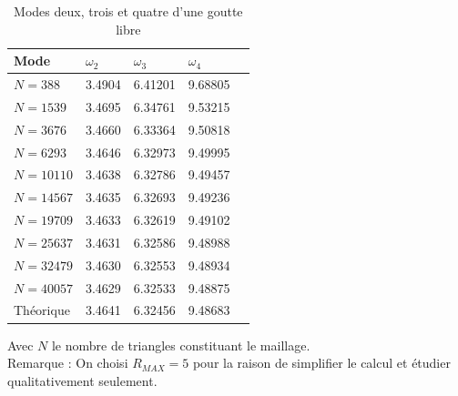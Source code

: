 \documentclass[a4paper]{report}
\begin{document}
\begin{table}[htp]
\begin{center}
    \begin{tabular}{ | l | l | l | l | l | }
    \hline
    Mode & $\omega_2$ & $\omega_3$ & $\omega_4$ \\
    \hline
    $N = 388  $ & 3.4904 & 6.41201 & 9.68805 \\ %
    \hline
    $N = 1539 $ & 3.4695 & 6.34761 & 9.53215 \\ %
    \hline
    $N = 3676 $ & 3.4660 & 6.33364 & 9.50818 \\ %
    \hline
    $N = 6293 $ & 3.4646 & 6.32973 & 9.49995 \\ %
    \hline
    $N = 10110$ & 3.4638 & 6.32786 & 9.49457 \\ %
    \hline
    $N = 14567$ & 3.4635 & 6.32693 & 9.49236 \\ %
    \hline
    $N = 19709$ & 3.4633 & 6.32619 & 9.49102 \\ %
    \hline
    $N = 25637$ & 3.4631 & 6.32586 & 9.48988 \\ %
    \hline
    $N = 32479$ & 3.4630 & 6.32553 & 9.48934 \\ %
    \hline
    $N = 40057$ & 3.4629 & 6.32533 & 9.48875 \\ %
    \hline
    Théorique   & 3.4641 & 6.32456 & 9.48683 \\
    \hline
    \end{tabular}
\end{center}
\caption{Modes deux, trois et quatre d'une goutte libre}
\end{table}
Avec $N$ le nombre de triangles constituant le maillage.
\\[0.25cm]
Remarque : On choisi $R_{MAX} = 5$ pour la raison de simplifier le calcul et étudier qualitativement seulement.
\newpage
\end{document}
